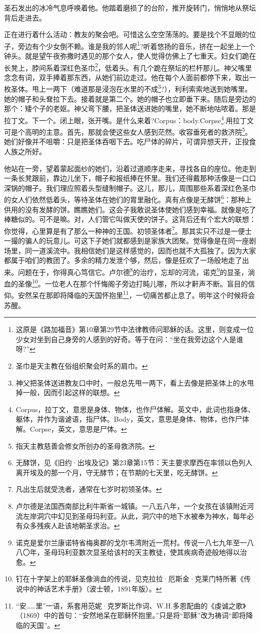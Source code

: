 \par 圣石发出的冰冷气息呼唤着他。他踏着磨损了的台阶，推开旋转门，悄悄地从祭坛背后走进去。
\par 正在进行着什么活动：教友的聚会吧。可惜这么空空荡荡的。要是找个不显眼的位子，旁边有个少女倒不赖。谁是我的邻人呢\footnote{这原是《路加福音》第10章第29节中法律教师问耶稣的话。这里，则变成一位少女对坐到自己身旁的人感到的好奇。等于在问：“坐在我旁边这个人是谁呀?”}?听着悠扬的音乐，挤在一起坐上一个钟头。就是望午夜弥撒时遇见的那个女人，使人觉得仿佛上了七重天。妇女们跪在长凳上，脖间系着深红色圣巾\footnote{圣巾是天主教在俗组织聚会时系的肩巾。}，低着头。有几个跪在祭坛的栏杆那儿。神父嘴里念念有词，双手捧着那东西，从她们前边走过。他在每个人面前都停下来，取出一枚圣体。甩上一两下（难道那是浸泡在水里的不成\footnote{神父把圣体送进教友口中时，一般总先甩一两下，看上去像是把圣体上的水甩掉一般，因而引起这样的联想。}?），利利索索地送到她嘴里。她的帽子和头耷拉下去。接着就是第二个。她的帽子也立即垂下来。随后是旁边的那个：矮个子的老妪。神父弯下腰，把圣体送进她的嘴里，她不断地咕哝着。那是拉丁文。下一个。闭上眼，张开嘴。是什么来着?Corpus：body.Corpse\footnote{Corpus，拉丁文，意思是身体、物体，也作尸体解。英文中，此词也指身体、躯体，并作为谐谑语，指尸体。Body，英文，意思是身体、物体，也作尸体解。Corpse，英文，意思是尸体。}.用拉丁文可是个高明的主意。首先，那就会使这些女人感到茫然。收容垂死者的救济院\footnote{指天主教慈善会修女所创办的圣母救济院。}。她们好像并不咀嚼：只是把圣体吞咽下去。吃尸体的碎片，可谓异想天开，正投食人族之所好。
\par 他站在一旁，望着蒙起面纱的她们，沿着过道顺序走来，寻找各自的座位。他走到一条长凳跟前，靠边儿坐下，帽子和报纸捧在怀里。我们还得戴那种活像是一口口深锅的帽子。我们理应照着头型缝制帽子。这儿，那儿，周围那些系着深红色圣巾的女人们依然低着头，等待圣体在她们的胃里融化。真有点像是无酵饼\footnote{无酵饼，见《旧约·出埃及记》第23章第15节：天主要求摩西在率领以色列人离开埃及的那一个月，守无酵节；在节期的七天里，吃无酵饼。}：那种上供用的没有发酵的饼。瞧瞧她们。这会子我敢说圣体使她们感到幸福。就像是吃了棒糖似的。可不是嘛。对，人们管它叫做天使的饼子。这背后还有个宏大的联想：你觉得，心里算是有了那么一种神的王国。初领圣体者\footnote{凡出生后就受洗者，通常在七岁时初领圣体。}。那其实只不过是一便士一撮的骗人的玩意儿。可这下子她们就都感到是家族大团聚。觉得像是在同一座剧场里，同一道溪流中。我相信她们是这样感觉的，因而也就不大孤独了。因为大家都属于咱们的教团了。多余的精力发泄个够，然后，像是狂欢了一场般地走了出来。问题在于，你得真心笃信它。卢尔德\footnote{卢尔德是法国西南部比利牛斯省一城镇。一八五八年，一个女孩在该镇附近河流左岸洞穴中幻见到圣母玛利亚。从此，洞穴中的地下水被奉为神水，每年必有众多残疾人赴该地朝圣求治。}的治疗，忘却的河流，诺克\footnote{诺克是爱尔兰康诺特省梅奥郡的戈尔韦湾附近一荒村。传说一八七九年至一八八〇年，圣母玛利亚数次显圣给该村的天主教徒，使其疾病奇迹般地得以治愈。}的显圣，淌血的圣像\footnote{钉在十字架上的耶稣圣像淌血的传说，见克拉拉·厄斯金·克莱门特所著《传说中的神话艺术手册》（波士顿，1891年版）。}。一位老人在那个忏悔阁子旁边打盹儿哪，所以才鼾声不断。盲目的信仰。安然呆在那即将降临的天国怀抱里\footnote{“安……里”一语，系套用范妮·克罗斯比作词、W.H.多恩配曲的《虔诚之歌》（1869）中的首句：“安然地呆在耶稣怀抱里。”只是将“耶稣”改为祷词“即将降临的天国”。}，一切痛苦都止息了。明年这个时候将会苏醒。

